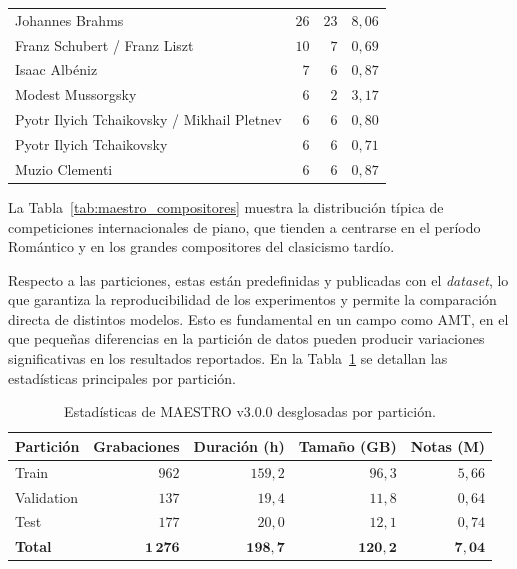 \documentclass[11pt,spanish,listoffigures,listoftables]{tfgetsinf}
\begin{document}
\begin{table}[H]
{\begin{tabular}{lrrr}
      Johannes Brahms                                 &  $26$ &  $23$ &  $8{,}06$ \\
      Franz Schubert / Franz Liszt                    &  $10$ &   $7$ &  $0{,}69$ \\
      Isaac Albéniz                                   &   $7$ &   $6$ &  $0{,}87$ \\
      Modest Mussorgsky                               &   $6$ &   $2$ &  $3{,}17$ \\
      Pyotr Ilyich Tchaikovsky / Mikhail Pletnev      &   $6$ &   $6$ &  $0{,}80$ \\
      Pyotr Ilyich Tchaikovsky                        &   $6$ &   $6$ &  $0{,}71$ \\
      Muzio Clementi                                  &   $6$ &   $6$ &  $0{,}87$ \\
      \hline
    \end{tabular}
  }
  
\end{table}

La Tabla~\ref{tab:maestro_compositores} muestra la distribución típica de competiciones internacionales de piano, que tienden a centrarse en el período Romántico y en los 
grandes compositores del clasicismo tardío.

Respecto a las particiones, estas están predefinidas y publicadas con el \textit{dataset}, lo que garantiza la reproducibilidad de los experimentos y permite la comparación directa de distintos modelos.
Esto es fundamental en un campo como AMT, en el que pequeñas diferencias en la partición de datos pueden producir variaciones significativas en los resultados reportados.
En la Tabla~\ref{tab:maestro_stats} se detallan las estadísticas principales por partición.

\begin{table}[H]
  \centering
  \caption[Estadísticas de MAESTRO v3.0.0 por partición]{%
    Estadísticas de MAESTRO v3.0.0 desglosadas por partición.}
  \label{tab:maestro_stats}
  \begin{tabular}{lrrrr}
    \hline
    \textbf{Partición} & \textbf{Grabaciones} & \textbf{Duración (h)} &
    \textbf{Tamaño (GB)} & \textbf{Notas (M)} \\
    \hline
    Train      & $962$     & $159{,}2$ & $96{,}3$  & $5{,}66$ \\
    Validation & $137$     & $19{,}4$  & $11{,}8$  & $0{,}64$ \\
    Test       & $177$     & $20{,}0$  & $12{,}1$  & $0{,}74$ \\
    \hline
    \textbf{Total} & $\mathbf{1\,276}$ & $\mathbf{198{,}7}$ &
    $\mathbf{120{,}2}$ & $\mathbf{7{,}04}$ \\
    \hline
  \end{tabular}
  
\end{table}
\end{document}
